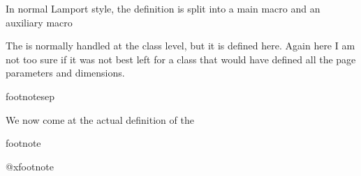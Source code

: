 In normal Lamport style, the definition is split into a main macro and an auxiliary
macro 
%
%
The  is normally handled at the class level, but it is defined
here. Again here I am not too sure if it was not best left for a class that would have
defined all the page parameters and dimensions.

 \begin{docCommand}{footnotesep} {}
    \begin{teX}
\newdimen\footnotesep
    \end{teX}
 \end{docCommand}
%
We now come at the actual definition of the 
\begin{docCommand}{footnote} {}
\begin{teX}
\def\footnote{\@ifnextchar[\@xfootnote{\stepcounter\@mpfn
     \protected@xdef\@thefnmark{\thempfn}%
     \@footnotemark\@footnotetext}}
    \end{teX}
 \end{docCommand}
%
 \begin{docCommand}{@xfootnote} {}
    \begin{teX}
\def\@xfootnote[#1]{%
   \begingroup 
     \csname c@\@mpfn\endcsname #1\relax
     \unrestored@protected@xdef\@thefnmark{\thempfn}%
   \endgroup
   \@footnotemark\@footnotetext}
    \end{teX}
 \end{docCommand}

